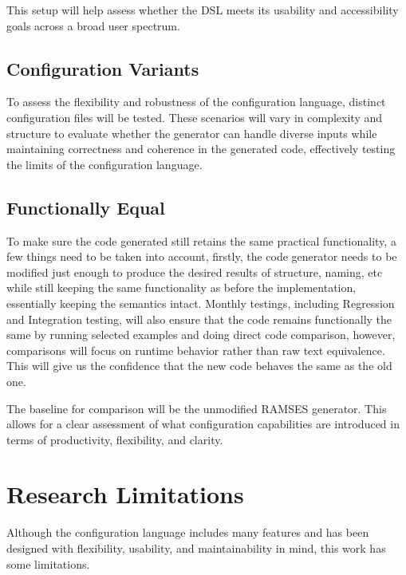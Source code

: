This setup will help assess whether the DSL meets its usability and accessibility goals across a broad user spectrum.

\subsection*{Configuration Variants}

To assess the flexibility and robustness of the configuration language, distinct configuration files will be tested. These scenarios will vary in complexity and structure to evaluate whether the generator can handle diverse inputs while maintaining correctness and coherence in the generated code, effectively testing the limits of the configuration language.

\subsection*{Functionally Equal}

To make sure the code generated still retains the same practical functionality, a few things need to be taken into account, firstly, the code generator needs to be modified just enough to produce the desired results of structure, naming, etc while still keeping the same functionality as before the implementation, essentially keeping the semantics intact. Monthly testings, including Regression and Integration testing, will also ensure that the code remains functionally the same by running selected examples and doing direct code comparison, however, comparisons will focus on runtime behavior rather than raw text equivalence. This will give us the confidence that the new code behaves the same as the old one.

The baseline for comparison will be the unmodified RAMSES generator. This allows for a clear assessment of what configuration capabilities are introduced in terms of productivity, flexibility, and clarity. 


\section{Research Limitations}
\label{sec:research_limitations}

Although the configuration language includes many features and has been designed with flexibility, usability, and maintainability in mind, this work has some limitations.


